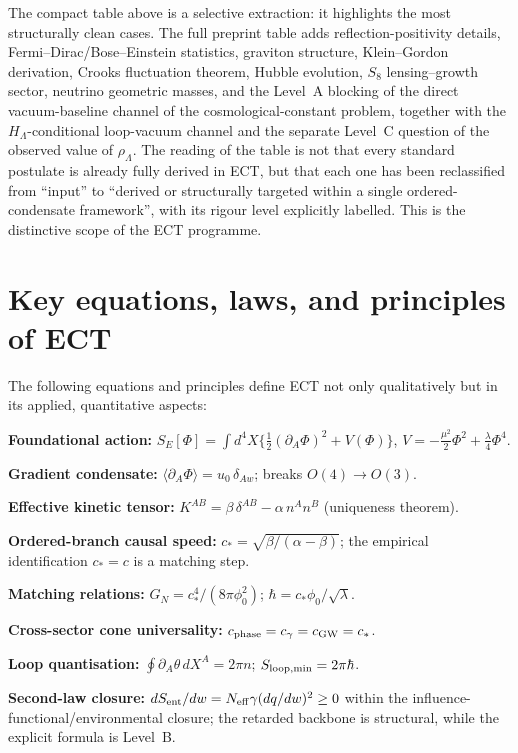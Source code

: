 \documentclass[11pt,a4paper]{article}
\begin{document}
The compact table above is a selective extraction: it highlights
the most structurally clean cases. The full preprint table adds
reflection-positivity details, Fermi--Dirac/Bose--Einstein
statistics, graviton structure, Klein--Gordon derivation,
Crooks fluctuation theorem, Hubble evolution, $S_8$ lensing--growth
sector, neutrino geometric masses, and the
Level~A blocking of the direct vacuum-baseline channel of the
cosmological-constant problem, together with the $H_\Lambda$-conditional
loop-vacuum channel and the separate Level~C question of the observed
value of $\rho_\Lambda$. The reading of the
table is not that every standard postulate is already fully derived
in ECT, but that each one has been reclassified from ``input'' to
``derived or structurally targeted within a single ordered-condensate
framework'', with its rigour level explicitly labelled. This is the
distinctive scope of the ECT programme.

\section{Key equations, laws, and principles of ECT}

The following equations and principles define ECT not only qualitatively but in its applied, quantitative aspects:

\textbf{Foundational action:}
$S_E[\Phi] = \int d^4X\{\frac{1}{2}(\partial_A\Phi)^2 + V(\Phi)\}$, $V = -\frac{\mu^2}{2}\Phi^2 + \frac{\lambda}{4}\Phi^4$.

\textbf{Gradient condensate:}
$\langle\partial_A\Phi\rangle = u_0\,\delta_{Aw}$; breaks $O(4) \to O(3)$.

\textbf{Effective kinetic tensor:}
$K^{AB} = \beta\,\delta^{AB} - \alpha\,n^An^B$ (uniqueness theorem).

\textbf{Ordered-branch causal speed:}
$c_* = \sqrt{\beta/(\alpha - \beta)}$; the empirical identification $c_*=c$ is a matching step.

\textbf{Matching relations:}
$G_N = c_*^4/(8\pi\phi_0^2)$; \quad $\hbar = c_*\phi_0/\sqrt{\lambda}$.

\textbf{Cross-sector cone universality:}
$c_{\rm phase} = c_\gamma = c_{\rm GW} = c_*$.

\textbf{Loop quantisation:}
$\oint \partial_A\theta\,dX^A = 2\pi n$; \quad $S_{\rm loop,min} = 2\pi\hbar$.

\textbf{Second-law closure:}
$dS_{\rm ent}/dw = N_{\rm eff}\gamma(dq/dw)^2 \geq 0$
within the influence-functional/environmental closure; the retarded backbone is structural, while the explicit formula is Level~B.
\end{document}
